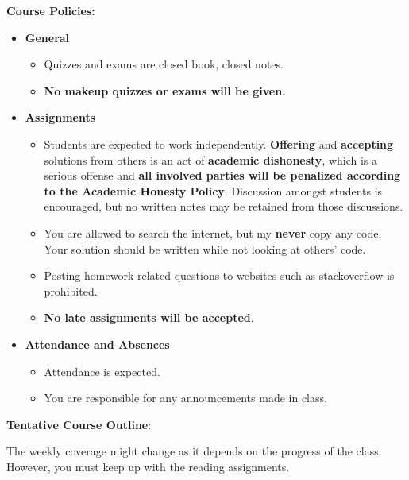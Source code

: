 \documentclass[11pt]{article}
\begin{document}
\textbf {\large Course Policies:}
\begin{itemize}
	\item \textbf {General}
		\begin{itemize}
			\item Quizzes and exams are closed book, closed notes.
			\item \textbf {No makeup quizzes or exams will be given.}
		\end{itemize}
	\item \textbf {Assignments}
		\begin{itemize}
			\item Students are expected to work independently. \textbf{Offering} and \textbf{accepting} solutions from others is an act of \textbf{academic dishonesty}, which is a serious offense and \textbf{all involved parties will be penalized according to the Academic Honesty Policy}. Discussion amongst students is encouraged, but no written notes may be retained from those discussions.
			\item You are allowed to search the internet, but my \textbf{never} copy any code.  Your solution should be written while not looking at others' code.
			\item Posting homework related questions to websites such as stackoverflow is prohibited.
			\item \textbf{No late assignments will be accepted}.
		\end{itemize}
	\item \textbf{Attendance and Absences}
		\begin{itemize}
			\item Attendance is expected.
			\item You are responsible for any announcements made in class.
		\end{itemize}
\end{itemize}





\newpage
\textbf {\large Tentative Course Outline}:

The weekly coverage might change as it depends on the progress of the class.  However, you must keep up with the reading assignments.
\end{document}
